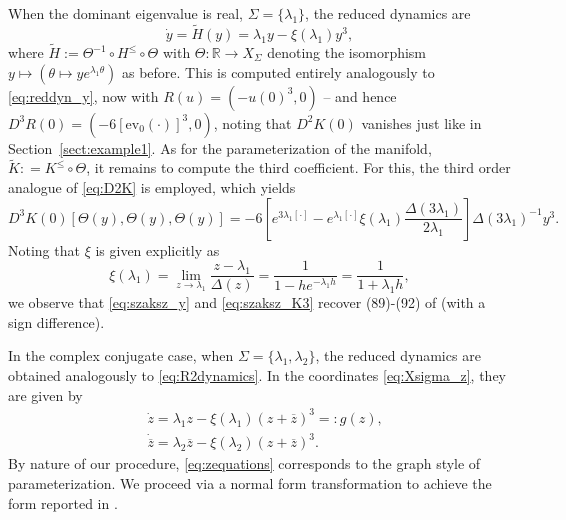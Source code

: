 \documentclass[a4paper, 12pt, oneside, reqno, notitlepage]{amsart}
\theoremstyle{plain}
\theoremstyle{definition}
\theoremstyle{remark}
\begin{document}
When the dominant eigenvalue is real, $\Sigma = \{\lambda_1\}$, the reduced dynamics are 
\begin{equation}
    \dot{y}= \widetilde{H}(y) = \lambda_1 y - \xi(\lambda_1) y^3,
    \label{eq:szaksz_y}
\end{equation}
where $\widetilde{H} := \Theta^{-1} \circ H^\leq \circ \Theta$ with $\Theta : \mathbb{R} \to X_\Sigma$ denoting the isomorphism $y \mapsto (\theta \mapsto y e^{\lambda_1 \theta})$ as before.
This is computed entirely analogously to \eqref{eq:reddyn_y}, now with $R (u)= (-u(0)^3,0)$ -- and hence $D^3R(0) = (-6 [\mathrm{ev}_0 (\cdot)]^3, 0)$, noting that $D^2K(0)$ vanishes just like in Section~\ref{sect:example1}.
As for the parameterization of the manifold, $\widetilde{K} : = K^\leq \circ \Theta$, it remains to compute the third coefficient. 
For this, the third order analogue of \eqref{eq:D2K} is employed, which yields
\begin{equation}
    D^3K(0)[\Theta(y),\Theta(y),\Theta(y)] = -6 \left[ e^{3 \lambda_1 [\cdot]} -e^{\lambda_1[\cdot]}  \xi(\lambda_1) \frac{\Delta(3\lambda_1)}{2 \lambda_1} \right]\Delta(3\lambda_1)^{-1} y^3.
    \label{eq:szaksz_K3}
\end{equation}
Noting that $\xi$ is given explicitly as 
\begin{displaymath}
    \xi(\lambda_1) = \lim_{z \to \lambda_1} \frac{z-\lambda_1}{\Delta(z)} = \frac{1}{1-he^{-\lambda_1 h}} = \frac{1}{1+\lambda_1 h},
\end{displaymath}
we observe that \eqref{eq:szaksz_y} and \eqref{eq:szaksz_K3} recover (89)-(92) of \cite{szaksz2025spectral} (with a sign difference).





In the complex conjugate case, when $\Sigma = \{ \lambda_1,\lambda_2\}$, the reduced dynamics are obtained analogously to \eqref{eq:R2dynamics}. 
In the coordinates \eqref{eq:Xsigma_z}, they are given by
\begin{subequations}\label{eq:zequations}
    \begin{align}
        &\dot{z} = \lambda_1 z - \xi(\lambda_1) (z + \overline{z})^3 =: g(z), \\
        &\dot{\overline{z}} = \lambda_2 \overline{z}  - \xi(\lambda_2) (z + \overline{z})^3.
    \end{align} 
\end{subequations}
By nature of our procedure, \eqref{eq:zequations} corresponds to the graph style of parameterization.
We proceed via a normal form transformation to achieve the form reported in \cite{szaksz2025spectral}.
\end{document}
